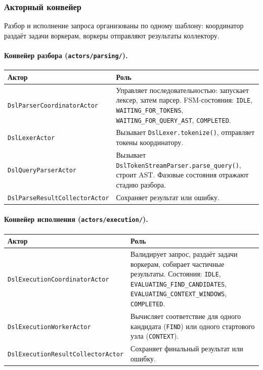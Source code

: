 \documentclass[a4paper,12pt]{article}
\begin{document}
\subsubsection{Акторный конвейер}

Разбор и исполнение запроса организованы по одному шаблону: координатор раздаёт задачи воркерам, воркеры отправляют результаты коллектору.

\paragraph{Конвейер разбора (\texttt{actors/parsing/}).}

\begin{table}[h!]
\centering
\small
\begin{tabularx}{\textwidth}{lX}
\toprule
\textbf{Актор}                          & \textbf{Роль} \\
\midrule
\texttt{DslParserCoordinatorActor}      & Управляет последовательностью: запускает лексер, затем парсер. FSM-состояния: \texttt{IDLE}, \texttt{WAITING\_FOR\_TOKENS}, \texttt{WAITING\_FOR\_QUERY\_AST}, \texttt{COMPLETED}. \\
\texttt{DslLexerActor}                  & Вызывает \texttt{DslLexer.tokenize()}, отправляет токены координатору. \\
\texttt{DslQueryParserActor}            & Вызывает \texttt{DslTokenStreamParser.parse\_query()}, строит AST. Фазовые состояния отражают стадию разбора. \\
\texttt{DslParseResultCollectorActor}   & Сохраняет результат или ошибку. \\
\bottomrule
\end{tabularx}
\end{table}

\paragraph{Конвейер исполнения (\texttt{actors/execution/}).}

\begin{table}[h!]
\centering
\small
\begin{tabularx}{\textwidth}{lX}
\toprule
\textbf{Актор}                             & \textbf{Роль} \\
\midrule
\texttt{DslExecutionCoordinatorActor}      & Валидирует запрос, раздаёт задачи воркерам, собирает частичные результаты. Состояния: \texttt{IDLE}, \texttt{EVALUATING\_FIND\_CANDIDATES}, \texttt{EVALUATING\_CONTEXT\_WINDOWS}, \texttt{COMPLETED}. \\
\texttt{DslExecutionWorkerActor}           & Вычисляет соответствие для одного кандидата (\texttt{FIND}) или одного стартового узла (\texttt{CONTEXT}). \\
\texttt{DslExecutionResultCollectorActor}  & Сохраняет финальный результат или ошибку. \\
\bottomrule
\end{tabularx}
\end{table}
\end{document}
